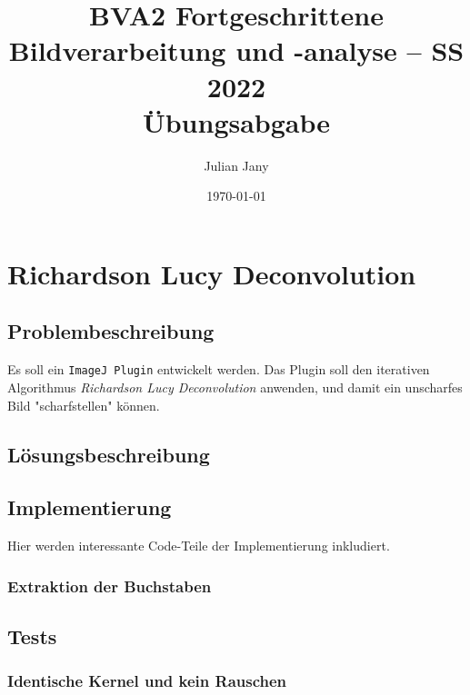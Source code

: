 \documentclass[german,notitlepage,smartquotes]{hgbreport}
\author{Julian Jany}                        %
\title{BVA2 Fortgeschrittene Bildverarbeitung und -analyse -- SS 2022\\ %
				Übungsabgabe \arabic{chapter}}
\date{\today}
\begin{document}
\maketitle



\section{Richardson Lucy Deconvolution}

\subsection{Problembeschreibung}

Es soll ein \texttt{ImageJ Plugin} entwickelt werden. 
Das Plugin soll den iterativen Algorithmus \textit{Richardson Lucy Deconvolution} anwenden, und damit ein \zB unscharfes Bild "scharfstellen" können. 

\subsection{Lösungsbeschreibung}

\subsection{Implementierung}

Hier werden interessante Code-Teile der Implementierung inkludiert.

\subsubsection{Extraktion der Buchstaben}

\subsection{Tests}

\subsubsection{Identische Kernel und kein Rauschen}
\end{document}
